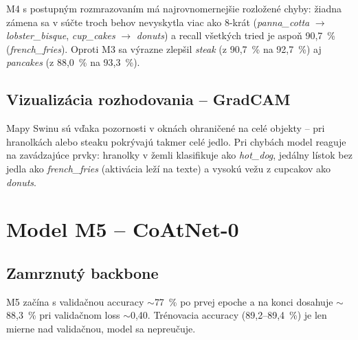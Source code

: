 
M4 s postupným rozmrazovaním má najrovnomernejšie rozložené chyby: žiadna
zámena sa v súčte troch behov nevyskytla viac ako 8-krát
(\emph{panna\_cotta} $\rightarrow$ \emph{lobster\_bisque},
\emph{cup\_cakes} $\rightarrow$ \emph{donuts}) a recall všetkých tried je
aspoň 90,7~\% (\emph{french\_fries}). Oproti M3 sa výrazne zlepšil
\emph{steak} (z 90,7~\% na 92,7~\%) aj \emph{pancakes} (z 88,0~\% na
93,3~\%).

\subsection{Vizualizácia rozhodovania -- GradCAM}


Mapy Swinu sú vďaka pozornosti v oknách ohraničené na celé objekty -- pri
hranolkách alebo steaku pokrývajú takmer celé jedlo. Pri chybách model
reaguje na zavádzajúce prvky: hranolky v žemli klasifikuje ako
\emph{hot\_dog}, jedálny lístok bez jedla ako \emph{french\_fries} (aktivácia
leží na texte) a vysokú vežu z cupcakov ako \emph{donuts}.

\section{Model M5 -- CoAtNet-0}
\label{sec:m5}

\subsection{Zamrznutý backbone}


M5 začína s validačnou accuracy $\sim$77~\% po prvej epoche a na konci
dosahuje $\sim$88,3~\% pri validačnom loss $\sim$0,40. Trénovacia accuracy
(89,2--89,4~\%) je len mierne nad validačnou, model sa nepreučuje.

